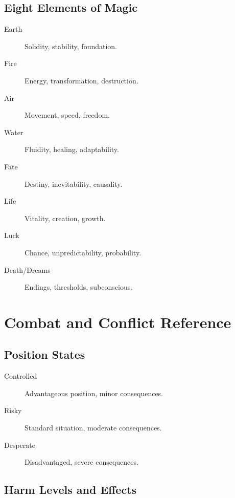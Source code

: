 \subsection{Eight Elements of Magic}
\label{subsec:elements-ref}

\begin{description}
\item[Earth] Solidity, stability, foundation.
\item[Fire] Energy, transformation, destruction.
\item[Air] Movement, speed, freedom.
\item[Water] Fluidity, healing, adaptability.
\item[Fate] Destiny, inevitability, causality.
\item[Life] Vitality, creation, growth.
\item[Luck] Chance, unpredictability, probability.
\item[Death/Dreams] Endings, thresholds, subconscious.
\end{description}

\section{Combat and Conflict Reference}
\label{sec:combat-reference}

\subsection{Position States}
\label{subsec:position-ref}

\begin{description}
\item[Controlled] Advantageous position, minor consequences.
\item[Risky] Standard situation, moderate consequences.
\item[Desperate] Disadvantaged, severe consequences.
\end{description}

\subsection{Harm Levels and Effects}
\label{subsec:harm-ref}

